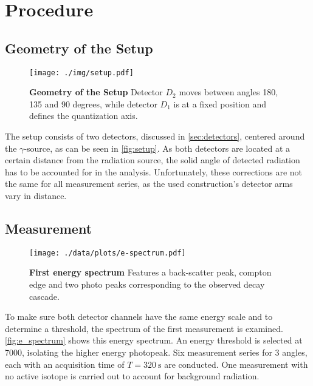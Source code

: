\chapter{Procedure}

\section{Geometry of the Setup}
\begin{figure}[tbp]
	\centering
	\texttt{[image: ./img/setup.pdf]}
	\caption[Geometry of the Setup]{\textbf{Geometry of the Setup} Detector $D_2$ moves between angles 180, 135 and 90 degrees, while detector $D_1$ is at a fixed position and defines the quantization axis.}
	\label{fig:setup}
\end{figure}
The setup consists of two detectors, discussed in \autoref{sec:detectors}, centered around the $\gamma$-source, as can be seen in \autoref{fig:setup}.
As both detectors are located at a certain distance from the radiation source, the solid angle of detected radiation has to be accounted for in the analysis.
Unfortunately, these corrections are not the same for all measurement series, as the used construction's detector arms vary in distance.

\section{Measurement}
\begin{figure}[tbp]
	\centering
	\texttt{[image: ./data/plots/e-spectrum.pdf]}
	\caption[First energy spectrum]{\textbf{First energy spectrum} Features a back-scatter peak, compton edge and two photo peaks corresponding to the observed decay cascade.}
	\label{fig:e_spectrum}
\end{figure}
To make sure both detector channels have the same energy scale and to determine a threshold, the spectrum of the first measurement is examined.
\autoref{fig:e_spectrum} shows this energy spectrum.
An energy threshold is selected at 7000, isolating the higher energy photopeak.
Six measurement series for 3 angles, each with an acquisition time of $T=\SI{320}{\second}$ are conducted.
One measurement with no active isotope is carried out to account for background radiation. 
